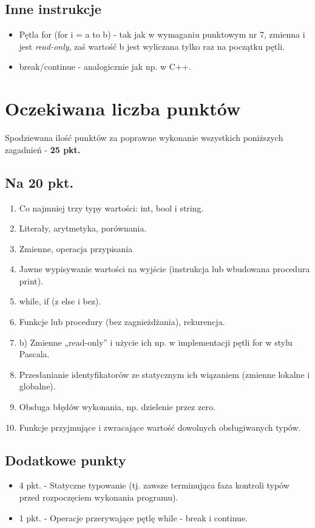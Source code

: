 \documentclass{article}
\begin{document}
\subsection{Inne instrukcje}

\begin{itemize}
    \item Pętla for (for i = a to b) - tak jak w wymaganiu punktowym nr 7, zmienna i jest \textit{read-only}, zaś wartość b jest wyliczana tylko raz na początku pętli.
    \item break/continue - analogicznie jak np. w C++.
\end{itemize}

\newpage
\section{Oczekiwana liczba punktów}

Spodziewana ilość punktów za poprawne wykonanie wszystkich poniższych zagadnień - \textbf{25 pkt.}

\subsection{Na 20 pkt.}
\begin{enumerate}
    \item Co najmniej trzy typy wartości: int, bool i string.
    \item Literały, arytmetyka, porównania.
    \item Zmienne, operacja przypisania
    \item Jawne wypisywanie wartości na wyjście (instrukcja lub wbudowana procedura print).
    \item while, if (z else i bez).
    \item Funkcje lub procedury (bez zagnieżdżania), rekurencja.
    \item b) Zmienne „read-only” i użycie ich np. w implementacji pętli for w stylu Pascala.
    \item Przesłanianie identyfikatorów ze statycznym ich wiązaniem (zmienne lokalne i globalne).
    \item Obsługa błędów wykonania, np. dzielenie przez zero.
    \item Funkcje przyjmujące i zwracające wartość dowolnych obsługiwanych typów.
\end{enumerate}

\subsection{Dodatkowe punkty}
\begin{itemize}
    \item 4 pkt. - Statyczne typowanie (tj. zawsze terminująca faza kontroli typów przed rozpoczęciem wykonania programu).
    \item 1 pkt. - Operacje przerywające pętlę while - break i continue.
\end{itemize}
\end{document}
